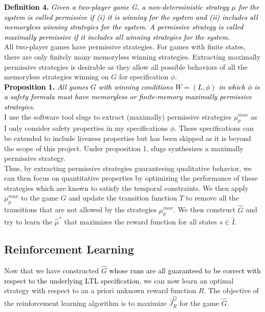 \documentclass[letterpaper, 10 pt, conference]{ieeeconf}  %
\begin{document}

\textcolor{black} {\textbf{Definition 4.}\textit{ Given a two-player game G, a non-deterministic strategy $\mu$ for the system is called permissive if (i) it is winning for the system and (ii) includes all memoryless winning strategies for the system. A permissive strategy is called maximally permissive if it includes all winning strategies for the system.}}\\

All two-player games have permissive strategies. For games with finite states, there are only finitely many memoryless winning strategies. Extracting maximally permissive strategies is desirable as they allow all possible behaviors of all the memoryless strategies winning on $G$ for specification $\phi$.\\

\textcolor{black} {\textbf{Proposition 1.}\cite{c4}\textit{ All games $G$ with winning conditions $W = (L, \phi)$ in which $\phi$ is a safety formula must have memoryless or finite-memory maximally permissive strategies.}}\\

I use the software tool slugs to extract (maximally) permissive strategies $\mu_p^{max}$ as I only consider safety properties in my specifications $\phi$. These specifications can be extended to include liveness properties but has been skipped as it is beyond the scope of this project. Under proposition 1, slugs synthesizes a maximally permissive strategy.\\

Thus, by extracting permissive strategies guaranteeing qualitative behavior, we can then focus on quantitative properties by optimizing the performance of these strategies which are known to satisfy the temporal constraints. We then apply $\mu_p^{max}$ to the game $G$ and update the transition function $T$ to remove all the transitions that are not allowed by the strategies $\mu_p^{max}$. We then construct $\hat{G}$ and try to learn the $\hat{\mu}^*$ that maximizes the reward function for all states $s \in \hat{I}$. 


\subsection{Reinforcement Learning}

Now that we have constructed $\hat{G}$ \textcolor{black} {whose runs are all guaranteed to be correct with respect to the underlying LTL specification}, we can now learn an optimal strategy with respect to an a priori unknown reward function $R$. The objective of the reinforcement learning algorithm is to maximize $\bar{J}^{\hat{G}}_R$ for the game $\hat{G}$.\\
\end{document}
